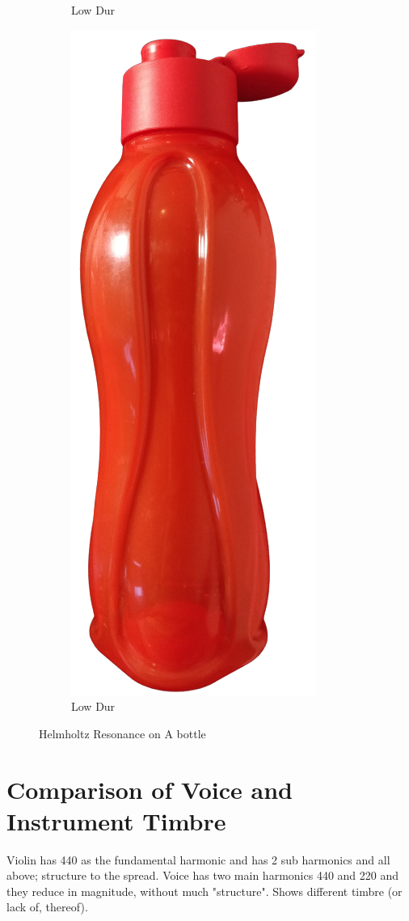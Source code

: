 \documentclass[10pt]{article}
\begin{document}
\begin{figure}[ht]
\begin{subfigure}[b]{0.48\textwidth}
        \caption{Low Dur}
    \end{subfigure}
    \quad
    \begin{subfigure}[b]{0.48\textwidth}
        \centering
        \includegraphics[scale=0.15]{bottle.png}
        \caption{Low Dur}
    \end{subfigure}
    \caption{Helmholtz Resonance on A bottle\vspace{-0.5cm}}
    \label{helmholtz_resonance}
\end{figure}

\section{Comparison of Voice and Instrument Timbre}
Violin has 440 as the fundamental harmonic and has 2 sub harmonics and all above; structure to the spread. Voice has two main harmonics 440 and 220 and they reduce in magnitude, without much "structure". Shows different timbre (or lack of, thereof).
\end{document}
